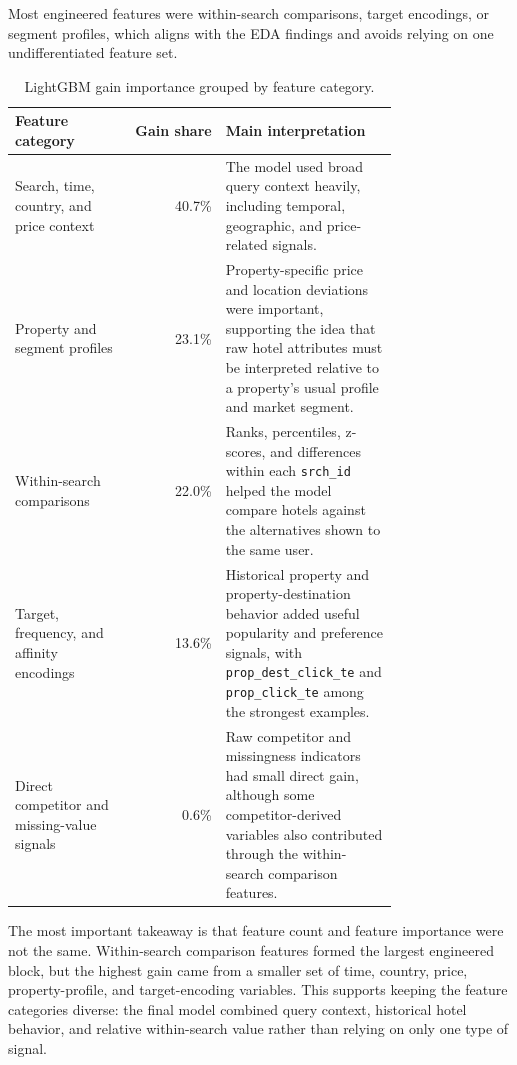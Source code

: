\documentclass[runningheads]{llncs}
\begin{document}
Most engineered features were within-search comparisons, target encodings, or segment profiles, which aligns with the EDA findings and avoids relying on one undifferentiated feature set.

\begin{table}[t]
\centering
\caption{LightGBM gain importance grouped by feature category.}
\label{tab:feature-importance-category}
\small
\begin{tabular}{@{}>{\raggedright\arraybackslash}p{0.31\linewidth}r>{\raggedright\arraybackslash}p{0.45\linewidth}@{}}
\toprule
Feature category & Gain share & Main interpretation \\
\midrule
Search, time, country, and price context & 40.7\% & The model used broad query context heavily, including temporal, geographic, and price-related signals. \\
Property and segment profiles & 23.1\% & Property-specific price and location deviations were important, supporting the idea that raw hotel attributes must be interpreted relative to a property's usual profile and market segment. \\
Within-search comparisons & 22.0\% & Ranks, percentiles, z-scores, and differences within each \texttt{srch\_id} helped the model compare hotels against the alternatives shown to the same user. \\
Target, frequency, and affinity encodings & 13.6\% & Historical property and property-destination behavior added useful popularity and preference signals, with \texttt{prop\_dest\_click\_te} and \texttt{prop\_click\_te} among the strongest examples. \\
Direct competitor and missing-value signals & 0.6\% & Raw competitor and missingness indicators had small direct gain, although some competitor-derived variables also contributed through the within-search comparison features. \\
\bottomrule
\end{tabular}
\end{table}

The most important takeaway is that feature count and feature importance were not the same.  Within-search comparison features formed the largest engineered block, but the highest gain came from a smaller set of time, country, price, property-profile, and target-encoding variables.  This supports keeping the feature categories diverse: the final model combined query context, historical hotel behavior, and relative within-search value rather than relying on only one type of signal.
\end{document}
